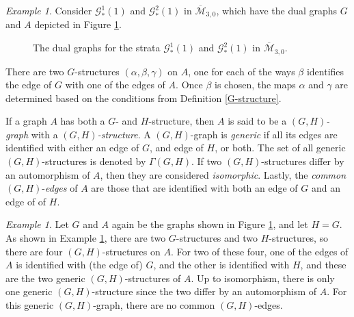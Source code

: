 \documentclass[leqno,12pt]{amsart}
\theoremstyle{remark}
\newtheorem{example}[theorem]{Example}
\numberwithin{equation}{section}
\begin{document}
\begin{example}\label{ex:GStructure}
    Consider $\mathcal{G}_*^1(1)$ and $\mathcal{G}_*^2(1)$ in $\overline{\mathcal{M}}_{3, 0}$, which have the  dual graphs $G$ and $A$ depicted in Figure \ref{fig:dualG1G2}.
\begin{figure}[tb]
    \centering
\begin{center}
\end{center}
    \caption{The dual graphs for the strata $\mathcal{G}_*^1(1)$ and $\mathcal{G}_*^2(1)$ in $\overline{\mathcal{M}}_{3, 0}$. }
    \label{fig:dualG1G2}
\end{figure}
There are two $G$-structures $(\alpha, \beta, \gamma)$ on $A$, one for each of the ways $\beta$ identifies the edge of $G$ with one of the edges of $A$. Once $\beta$ is chosen, the maps $\alpha$ and $\gamma$ are determined based on the conditions from Definition \ref{G-structure}.
\end{example}

If a graph $A$ has both a $G$- and $H$-structure, then $A$ is said to be a $(G, H)$\emph{-graph} with a $(G, H)$\emph{-structure}. A $(G, H)$-graph is \emph{generic} if all its edges are identified with either an edge of $G$, and edge of $H$, or both. The set of all generic $(G, H)$-structures is denoted by $\Gamma(G, H)$. If two $(G, H)$-structures differ by an automorphism of $A$, then they are considered \emph{isomorphic}. Lastly, the \emph{common} $(G, H)$-\emph{edges} of $A$ are those that are identified with both an edge of $G$ and an edge of of $H$.

\begin{example}
    Let $G$ and $A$ again be the graphs shown in Figure \ref{fig:dualG1G2}, and let $H = G$. As shown in Example \ref{ex:GStructure}, there are two $G$-structures and two $H$-structures, so there are four $(G, H)$-structures on $A$. For two of these four, one of the edges of $A$ is identified with (the edge of) $G$, and the other is identified with $H$, and these are the two generic $(G, H)$-structures of $A$. Up to isomorphism, there is only one generic $(G, H)$-structure since the two differ by an automorphism of $A$. For this generic $(G, H)$-graph, there are no common $(G, H)$-edges.
\end{example}
\end{document}
